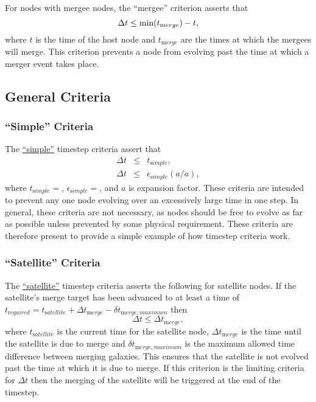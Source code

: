 For \glspl{node} with \gls{mergee} \glspl{node}, the ``\gls{mergee}'' criterion asserts that
\begin{equation}
 \Delta t \le \hbox{min}(t_{\mathrm merge}) - t,
\end{equation}
where $t$ is the time of the host \gls{node} and $t_{\mathrm merge}$ are the times at which the \glspl{mergee} will merge. This criterion prevents a \gls{node} from evolving past the time at which a merger event takes place.

\subsection{General Criteria}

\subsubsection{``Simple'' Criteria}

The \hyperlink{merger_trees.evolve.timesteps.simple.F90:merger_tree_timesteps_simple:merger_tree_timestep_simple}{``simple''} timestep criteria assert that
\begin{eqnarray}
\Delta t &\le& t_{\mathrm simple}, \\
\Delta t &\le& \epsilon_{\mathrm simple} (a/\dot{a}),
\end{eqnarray}
where $t_{\mathrm simple}=${\normalfont \ttfamily [timestepSimpleAbsolute]}, $\epsilon_{\mathrm simple}=${\normalfont \ttfamily [timestepSimpleRelative]}, and $a$ is expansion factor. These criteria are intended to prevent any one node evolving over an excessively large time in one step. In general, these criteria are not necessary, as nodes should be free to evolve as far as possible unless prevented by some physical requirement. These criteria are therefore present to provide a simple example of how timestep criteria work.

\subsubsection{``Satellite'' Criteria}

The \hyperlink{merger_trees.evolve.timesteps.satellite.F90:merger_tree_timesteps_satellite:merger_tree_timestep_satellite}{``satellite''} timestep criteria asserts the following for satellite \glspl{node}. If the satellite's merge target has been advanced to at least a time of $t_{\mathrm required} = t_{\mathrm satellite} + \Delta t_{\mathrm merge} - \delta t_{\mathrm merge,maximum}$ then 
\begin{equation}
\Delta t \le \Delta t_{\mathrm merge},
\end{equation}
where $t_{\mathrm satellite}$ is the current time for the satellite \gls{node}, $\Delta t_{\mathrm merge}$ is the time until the satellite is due to merge and $\delta t_{\mathrm merge,maximum}$ is the maximum allowed time difference between merging galaxies. This ensures that the satellite is not evolved past the time at which it is due to merge. If this criterion is the limiting criteria for $\Delta t$ then the merging of the satellite will be triggered at the end of the timestep.

